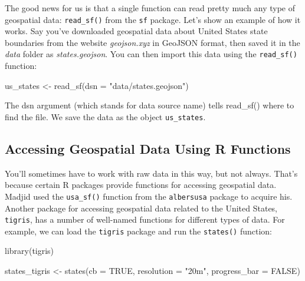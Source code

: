 \documentclass[
]{book}
\newenvironment{Shaded}{\begin{snugshade}}{\end{snugshade}}
\newcommand{\AttributeTok}[1]{\textcolor[rgb]{0.77,0.63,0.00}{#1}}
\newcommand{\ConstantTok}[1]{\textcolor[rgb]{0.00,0.00,0.00}{#1}}
\newcommand{\FunctionTok}[1]{\textcolor[rgb]{0.00,0.00,0.00}{#1}}
\newcommand{\NormalTok}[1]{#1}
\newcommand{\OtherTok}[1]{\textcolor[rgb]{0.56,0.35,0.01}{#1}}
\newcommand{\StringTok}[1]{\textcolor[rgb]{0.31,0.60,0.02}{#1}}
\begin{document}
The good news for us is that a single function can read pretty much any type of geospatial data: \texttt{read\_sf()} from the \texttt{sf} package. Let's show an example of how it works. Say you've downloaded geospatial data about United States state boundaries from the website \emph{geojson.xyz} in GeoJSON format, then saved it in the \emph{data} folder as \emph{states.geojson}. You can then import this data using the \texttt{read\_sf()} function:

\begin{Shaded}
\begin{Highlighting}[]
\NormalTok{us\_states }\OtherTok{\textless{}{-}} \FunctionTok{read\_sf}\NormalTok{(}\AttributeTok{dsn =} \StringTok{"data/states.geojson"}\NormalTok{)}
\end{Highlighting}
\end{Shaded}

The dsn argument (which stands for data source name) tells read\_sf() where to find the file. We save the data as the object \texttt{us\_states}.

\hypertarget{accessing-geospatial-data-using-r-functions}{%
\subsection*{Accessing Geospatial Data Using R Functions}\label{accessing-geospatial-data-using-r-functions}}

You'll sometimes have to work with raw data in this way, but not always. That's because certain R packages provide functions for accessing geospatial data. Madjid used the \texttt{usa\_sf()} function from the \texttt{albersusa} package to acquire his. Another package for accessing geospatial data related to the United States, \texttt{tigris}, has a number of well-named functions for different types of data. For example, we can load the \texttt{tigris} package and run the \texttt{states()} function:

\begin{Shaded}
\begin{Highlighting}[]
\FunctionTok{library}\NormalTok{(tigris)}

\NormalTok{states\_tigris }\OtherTok{\textless{}{-}} \FunctionTok{states}\NormalTok{(}\AttributeTok{cb =} \ConstantTok{TRUE}\NormalTok{, }
                        \AttributeTok{resolution =} \StringTok{"20m"}\NormalTok{,}
                        \AttributeTok{progress\_bar =} \ConstantTok{FALSE}\NormalTok{)}
\end{Highlighting}
\end{Shaded}
\end{document}
